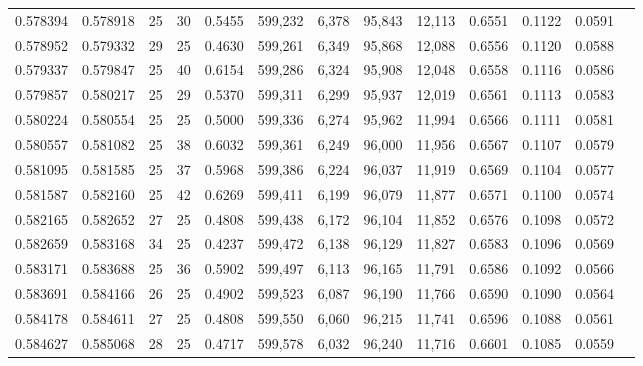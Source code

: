 \begin{tabular}{rrrrrrrrrrrrr}
0.578394 & 0.578918 &    25 &  30 &                                     0.5455 & 599,232 &   6,378 &  95,843 &  12,113 & 0.6551 & 0.1122 & 0.0591 \\
0.578952 & 0.579332 &    29 &  25 &                                     0.4630 & 599,261 &   6,349 &  95,868 &  12,088 & 0.6556 & 0.1120 & 0.0588 \\
0.579337 & 0.579847 &    25 &  40 &                                     0.6154 & 599,286 &   6,324 &  95,908 &  12,048 & 0.6558 & 0.1116 & 0.0586 \\
0.579857 & 0.580217 &    25 &  29 &                                     0.5370 & 599,311 &   6,299 &  95,937 &  12,019 & 0.6561 & 0.1113 & 0.0583 \\
0.580224 & 0.580554 &    25 &  25 &                                     0.5000 & 599,336 &   6,274 &  95,962 &  11,994 & 0.6566 & 0.1111 & 0.0581 \\
0.580557 & 0.581082 &    25 &  38 &                                     0.6032 & 599,361 &   6,249 &  96,000 &  11,956 & 0.6567 & 0.1107 & 0.0579 \\
0.581095 & 0.581585 &    25 &  37 &                                     0.5968 & 599,386 &   6,224 &  96,037 &  11,919 & 0.6569 & 0.1104 & 0.0577 \\
0.581587 & 0.582160 &    25 &  42 &                                     0.6269 & 599,411 &   6,199 &  96,079 &  11,877 & 0.6571 & 0.1100 & 0.0574 \\
0.582165 & 0.582652 &    27 &  25 &                                     0.4808 & 599,438 &   6,172 &  96,104 &  11,852 & 0.6576 & 0.1098 & 0.0572 \\
0.582659 & 0.583168 &    34 &  25 &                                     0.4237 & 599,472 &   6,138 &  96,129 &  11,827 & 0.6583 & 0.1096 & 0.0569 \\
0.583171 & 0.583688 &    25 &  36 &                                     0.5902 & 599,497 &   6,113 &  96,165 &  11,791 & 0.6586 & 0.1092 & 0.0566 \\
0.583691 & 0.584166 &    26 &  25 &                                     0.4902 & 599,523 &   6,087 &  96,190 &  11,766 & 0.6590 & 0.1090 & 0.0564 \\
0.584178 & 0.584611 &    27 &  25 &                                     0.4808 & 599,550 &   6,060 &  96,215 &  11,741 & 0.6596 & 0.1088 & 0.0561 \\
0.584627 & 0.585068 &    28 &  25 &                                     0.4717 & 599,578 &   6,032 &  96,240 &  11,716 & 0.6601 & 0.1085 & 0.0559 \\

\end{tabular}
